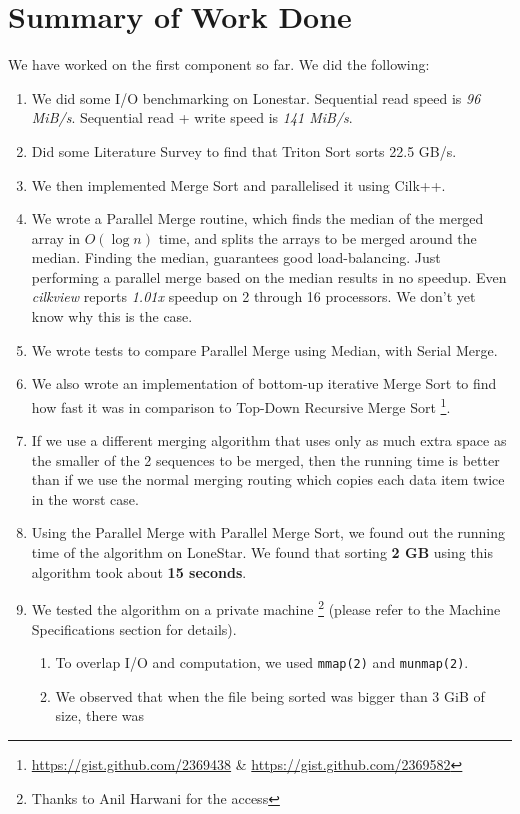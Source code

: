\documentclass{article}
\begin{document}
\section{Summary of Work Done}
We have worked on the first component so far. We did the following:
\begin{enumerate}
\item We did some I/O benchmarking on Lonestar. Sequential read speed is \textit{96 MiB/s}. Sequential read + write speed is \textit{141 MiB/s}.
\item Did some Literature Survey to find that Triton Sort sorts 22.5 GB/s.
\item We then implemented Merge Sort and parallelised it using Cilk++.
\item We wrote a Parallel Merge routine, which finds the median of the merged array in $O(\log{n})$ time, and splits the arrays to be merged around the median. Finding the median, guarantees good load-balancing. Just performing a parallel merge based on the median results in no speedup. Even \textit{cilkview} reports \textit{1.01x} speedup on 2 through 16 processors. We don't yet know why this is the case.
\item We wrote tests to compare Parallel Merge using Median, with Serial Merge.
\item We also wrote an implementation of bottom-up iterative Merge Sort to find how fast it was in comparison to Top-Down Recursive Merge Sort \footnote{\url{https://gist.github.com/2369438} \& \url{https://gist.github.com/2369582}}.
\item If we use a different merging algorithm that uses only as much extra space as the smaller of the 2 sequences to be merged, then the running time is better than if we use the normal merging routing which copies each data item twice in the worst case.
\item Using the Parallel Merge with Parallel Merge Sort, we found out the running time of the algorithm on LoneStar. We found that sorting {\bf 2 GB} using this algorithm took about {\bf 15 seconds}.
\item We tested the algorithm on a private machine 
\footnote{Thanks to Anil Harwani for the access} (please refer 
to the Machine Specifications section for details).
	\begin{enumerate}
	\item To overlap I/O and computation, we used \texttt{mmap(2)} and \texttt{munmap(2)}.
	\item We observed that when the file being sorted was bigger than 3 GiB of size, there was

\end{enumerate}
\end{enumerate}
\end{document}
